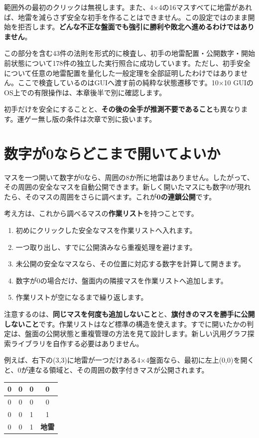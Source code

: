 \documentclass[11pt,a4paper,openany]{book}
\newcommand{\code}[1]{\texttt{\detokenize{#1}}}
\newcommand{\term}[1]{\textbf{#1}}
\begin{document}
範囲外の最初のクリックは無視します。また、4×4の16マスすべてに地雷があれば、地雷を減らさず安全な初手を作ることはできません。この設定では\code{Fresh}のまま開始を拒否します。\textbf{どんな不正な盤面でも強引に勝利や敗北へ進めるわけではありません}。

この部分を含む43件の法則を形式的に検査し、初手の地雷配置・公開数字・開始前状態について178件の独立した実行照合に成功しています。ただし、初手安全について任意の地雷配置を量化した一般定理を全部証明したわけではありません。ここで検査しているのはGUIへ渡す前の純粋な状態遷移です。10×10 GUIのOS上での有限操作は、本章後半で別に確認します。

初手だけを安全にすることと、\textbf{その後の全手が推測不要であること}も異なります。運ゲー無し版の条件は次章で別に扱います。

\section{数字が0ならどこまで開いてよいか}
マスを一つ開いて数字が0なら、周囲の8か所に地雷はありません。したがって、その周囲の安全なマスを自動公開できます。新しく開いたマスにも数字0が現れたら、そのマスの周囲をさらに調べます。これが\term{0の連鎖公開}です。

考え方は、これから調べるマスの\term{作業リスト}を持つことです。

\begin{enumerate}[leftmargin=*]
\item 初めにクリックした安全なマスを作業リストへ入れます。
\item 一つ取り出し、すでに公開済みなら重複処理を避けます。
\item 未公開の安全なマスなら、その位置に対応する数字を計算して開きます。
\item 数字が0の場合だけ、盤面内の隣接マスを作業リストへ追加します。
\item 作業リストが空になるまで繰り返します。
\end{enumerate}

注意するのは、\textbf{同じマスを何度も追加しないこと}と、\textbf{旗付きのマスを勝手に公開しないこと}です。作業リストは\code{List}など標準の構造を使えます。すでに開いたかの判定は、盤面の公開状態と重複管理の方法を見て設計します。新しい汎用グラフ探索ライブラリを自作する必要はありません。

例えば、右下の(3,3)に地雷が一つだけある4×4盤面なら、最初に左上(0,0)を開くと、0が連なる領域と、その周囲の数字付きマスが公開されます。

\begin{center}
\begin{tabular}{|c|c|c|c|}\hline
0 & 0 & 0 & 0\\\hline
0 & 0 & 0 & 0\\\hline
0 & 0 & 1 & 1\\\hline
0 & 0 & 1 & \textbf{地雷}\\\hline
\end{tabular}
\end{center}
\end{document}
